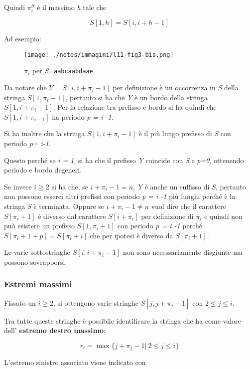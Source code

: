 Quindi $\pi_i^S$ è il massimo \emph{h} tale che

$$
S[1,h] = S[i, i+h-1]
$$

Ad esempio:

\begin{figure}[htbp]
\centering
\texttt{[image: ./notes/immagini/l11-fig3-bis.png]}
\caption{$\pi_i$ per \textit{S=}\texttt{aabcaabdaae}.}
\end{figure}

Da notare che $Y = S[i, i+\pi_i -1]$ per definizione è un occorrenza in \textit{S} della stringa $S[1, \pi_i -1]$, pertanto si ha che \textit{Y} è un bordo della stringa $S[1, i +\pi_i -1]$. 
Per la relazione tra prefisso e bordo si ha quindi che $S[1, i +\pi_{i -1}]$ ha periodo \textit{p = i -1}.

Si ha inoltre che la stringa $S[1, i +\pi_i -1]$ è il più lungo prefisso di \textit{S} con periodo \textit{p= i-1}.

Questo perché se \textit{i = 1}, si ha che il prefisso \textit{Y} coincide con \textit{S} e \textit{p=0}, ottenendo periodo e bordo degeneri.

Se invece $ i \geq 2 $ si ha che, se $i + \pi_i -1 = n $, \textit{Y} è anche un suffisso di \textit{S}, pertanto non possono esserci altri prefissi con periodo \textit{p = i -1} più lunghi perché è la stringa \textit{S} è terminata.
Oppure se $i + \pi_i -1 \neq n $ vuol dire che il carattere $ S[\pi_i + 1] $ è diverso dal carattere $ S[i+\pi_i] $ per definizione di $ \pi_i $ e quindi non può esistere un prefisso $ S[1, \pi_i +1] $ con periodo \textit{p = i -1} perché $ S[\pi_i  + 1 + p] = S[\pi_i + i] $ che per ipotesi è diverso da $ S[\pi_i +1] $.

Le varie sottostringhe $ S[i, i + \pi_i -1 ] $ non sono necessariamente disgiunte ma possono sovrapporsi.

\subsubsection{Estremi massimi}

Fissato un $ i \geq 2 $, si ottengono varie stringhe $ S[j, j + \pi_j -1] $ con $ 2 \leq j \leq i $.

Tra tutte queste stringhe è possibile identificare la stringa che ha come valore dell' \textbf{estremo destro massimo}:

$$
r_i = \max \{ j + \pi_j -1 | \: 2 \leq j \leq i\}
$$

L'estremo sinistro associato viene indicato con 

